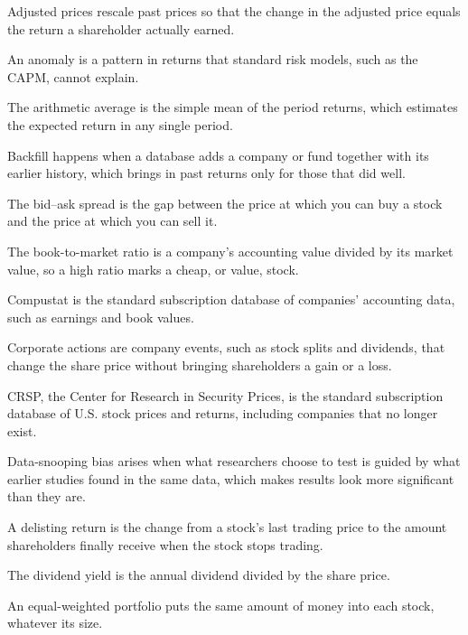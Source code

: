 \begin{keyterms}
\footnotesize
\begin{description}[leftmargin=0pt, itemsep=0pt, parsep=0pt, topsep=0pt, font=\normalfont\bfseries\color{FEMaroon}]
  \item[Adjusted prices.] Adjusted prices rescale past prices so that the change in the adjusted price equals the return a shareholder actually earned.
  \item[Anomaly.] An anomaly is a pattern in returns that standard risk models, such as the CAPM, cannot explain.
  \item[Arithmetic average.] The arithmetic average is the simple mean of the period returns, which estimates the expected return in any single period.
  \item[Backfill.] Backfill happens when a database adds a company or fund together with its earlier history, which brings in past returns only for those that did well.
  \item[Bid--ask spread.] The bid--ask spread is the gap between the price at which you can buy a stock and the price at which you can sell it.
  \item[Book-to-market.] The book-to-market ratio is a company's accounting value divided by its market value, so a high ratio marks a cheap, or value, stock.
  \item[Compustat.] Compustat is the standard subscription database of companies' accounting data, such as earnings and book values.
  \item[Corporate actions.] Corporate actions are company events, such as stock splits and dividends, that change the share price without bringing shareholders a gain or a loss.
  \item[CRSP.] CRSP, the Center for Research in Security Prices, is the standard subscription database of U.S. stock prices and returns, including companies that no longer exist.
  \item[Data-snooping bias.] Data-snooping bias arises when what researchers choose to test is guided by what earlier studies found in the same data, which makes results look more significant than they are.
  \item[Delisting return.] A delisting return is the change from a stock's last trading price to the amount shareholders finally receive when the stock stops trading.
  \item[Dividend yield.] The dividend yield is the annual dividend divided by the share price.
  \item[Equal-weighted.] An equal-weighted portfolio puts the same amount of money into each stock, whatever its size.

\end{description}
\end{keyterms}
